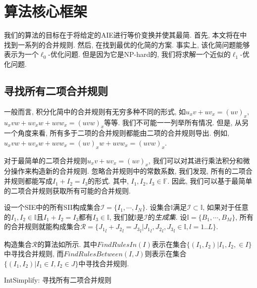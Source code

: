 \section{算法核心框架} \label{Simplify-03}
我们的算法的目标在于将给定的AIE进行等价变换并使其最简. 首先, 本文将在中找到一系列的合并规则. 然后, 在找到最优的化简的方案. 事实上, 该化简问题能够表示为一个$\ell_0$-优化问题. 但是因为它是NP-hard的, 我们将求解一个近似的$\ell_1$-优化问题. 


\subsection{寻找所有二项合并规则}\label{all_rules-03}
一般而言, 积分化简中的合并规则有无穷多种不同的形式, 如$u_x v + u v_x = (uv)_x$, $u_x v w+u v_x w + u v w_x = (uvw)_x$等等. 我们不可能一一列举所有情况. 但是, 从另一个角度来看, 所有多于二项的合并规则都能由二项的合并规则导出. 例如, $u_xvw+uv_xw+uvw_x=(uv)_xw+uvw_x=(uvw)_x$. 

对于最简单的二项合并规则$u_x v + u v_x = (uv)_x$, 我们可以对其进行乘法\D 积分和微分操作来构造新的合并规则. 忽略合并规则中的常数系数, 我们发现, 所有的二项合并规则都能写成$I_1+I_2=I_3$的形式. 其中, $I_1,I_2,I_3\in \mathbb F$. 因此, 我们可以基于最简单的二项合并规则获取所有可能的合并规则. 

设一个SIE中的所有SII构成集合$\mathcal I =\{I_1,\cdots,I_N\}$. 设集合$\mathbb I$满足$\mathcal I \subset \mathbb I$, 如果对于任意的$I_1,I_2\in \mathbb I$且$I_1+I_2=I_3$都有$I_3\in \mathbb I$, 我们就$\mathbb I$是$\mathcal I$的\emph{生成集}. 设$\mathbb I=\{B_1,\cdots,B_M\}$, 所有的合并规则就能构成集合$\mathcal R=\{{J_1}_l+{J_2}_l={J_3}_l|{J_1}_l,{J_2}_l,{J_3}_l \in \mathbb I, l=1..L\}$.

构造集合$\mathcal R$的算法如所示. 其中$FindRulesIn(I)$表示在集合$\{(I_1,I_2)|I_1,I_2,\in I\}$中寻找合并规则, 而$FindRulesBetween(I,J)$则表示在集合$\{(I_1,I_2)|I_1\in I, I_2\in J\}$中寻找合并规则. 

\begin{algorithm}
\caption{IntSimplify: 寻找所有二项合并规则}
\label{FindAllRules}
\end{algorithm}

